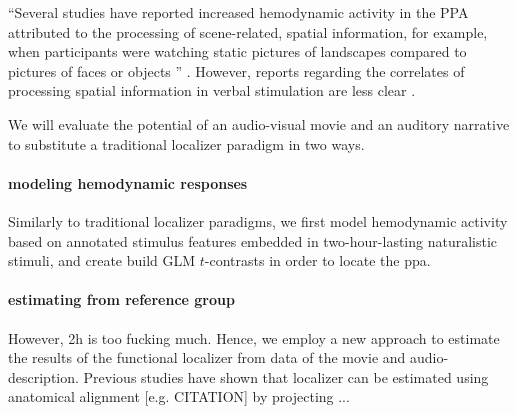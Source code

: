 ``Several studies have reported increased hemodynamic activity in the PPA
attributed to the processing of scene-related, spatial information, for example,
when participants were watching static pictures of landscapes compared to
pictures of faces or objects \citep{epstein1998ppa,
epstein1999parahippocampal}'' \citep{haeusler2022processing}.
However, reports regarding the correlates of processing spatial information in
verbal stimulation are less clear \citep{aziz2008modulation}.

%
We will evaluate the potential of an audio-visual movie and an auditory
narrative to substitute a traditional localizer paradigm in two ways.


\paragraph{modeling hemodynamic responses}
%
Similarly to traditional localizer paradigms, we first model hemodynamic
activity based on annotated stimulus features embedded in two-hour-lasting
naturalistic stimuli, and create build GLM $t$-contrasts in order to locate the
\ac{ppa}.


\paragraph{estimating from reference group}





%
However, 2h is too fucking much.
%
Hence, we employ a new approach to estimate the results of the functional
localizer from data of the movie and audio-description.
%
Previous studies have shown that localizer can be estimated using anatomical
alignment [e.g. CITATION] by projecting ...
%


